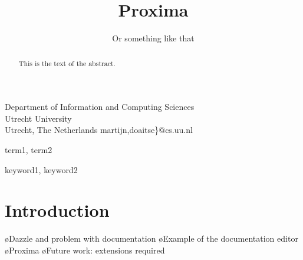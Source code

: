 \documentclass[preprint,natbib]{sigplanconf}
\begin{document}
\copyrightdata{[to be supplied]} 


\title{Proxima}
\subtitle{Or something like that}

           {Department of Information and Computing Sciences\\
         Utrecht University\\
         Utrecht, The Netherlands}
           {martijn,doaitse\}@cs.uu.nl}

\maketitle

\begin{abstract}
This is the text of the abstract.
\end{abstract}


\terms
term1, term2

\keywords
keyword1, keyword2

\section{Introduction}

\bl
\o Dazzle and problem with documentation
\o Example of the documentation editor
\o Proxima
\o Future work: extensions required
\el





\end{document}
